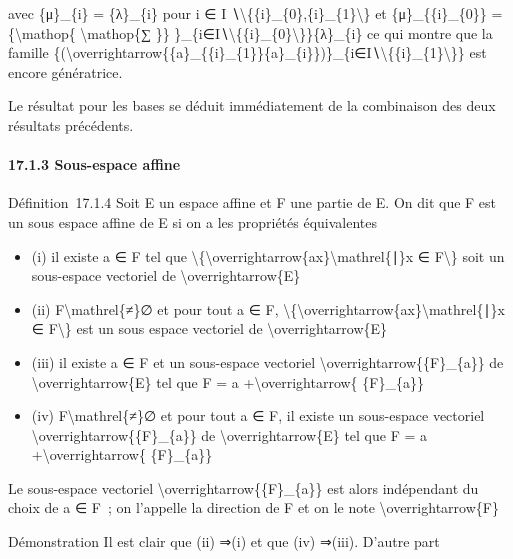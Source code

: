 \documentclass[]{article}
\begin{document}
avec \{μ\}\_\{i\} = \{λ\}\_\{i\} pour i ∈ I
∖\textbackslash{}\{\{i\}\_\{0\},\{i\}\_\{1\}\textbackslash{}\} et
\{μ\}\_\{\{i\}\_\{0\}\} =\{\textbackslash{}mathop\{
\textbackslash{}mathop\{∑ \}\}
\}\_\{i∈I∖\textbackslash{}\{\{i\}\_\{0\}\textbackslash{}\}\}\{λ\}\_\{i\}
ce qui montre que la famille
\{(\textbackslash{}overrightarrow\{\{a\}\_\{\{i\}\_\{1\}\}\{a\}\_\{i\}\})\}\_\{i∈I∖\textbackslash{}\{\{i\}\_\{1\}\textbackslash{}\}\}
est encore génératrice.

Le résultat pour les bases se déduit immédiatement de la combinaison des
deux résultats précédents.

\paragraph{17.1.3 Sous-espace affine}

Définition~17.1.4 Soit E un espace affine et F une partie de E. On dit
que F est un sous espace affine de E si on a les propriétés équivalentes

\begin{itemize}
\itemsep1pt\parskip0pt
\item
  (i) il existe a ∈ F tel que
  \textbackslash{}\{\textbackslash{}overrightarrow\{ax\}\textbackslash{}mathrel\{∣\}x
  ∈ F\textbackslash{}\} soit un sous-espace vectoriel de
  \textbackslash{}overrightarrow\{E\}
\item
  (ii) F\textbackslash{}mathrel\{≠\}∅ et pour tout a ∈ F,
  \textbackslash{}\{\textbackslash{}overrightarrow\{ax\}\textbackslash{}mathrel\{∣\}x
  ∈ F\textbackslash{}\} est un sous espace vectoriel de
  \textbackslash{}overrightarrow\{E\}
\item
  (iii) il existe a ∈ F et un sous-espace vectoriel
  \textbackslash{}overrightarrow\{\{F\}\_\{a\}\} de
  \textbackslash{}overrightarrow\{E\} tel que F = a
  +\textbackslash{}overrightarrow\{ \{F\}\_\{a\}\}
\item
  (iv) F\textbackslash{}mathrel\{≠\}∅ et pour tout a ∈ F, il existe un
  sous-espace vectoriel \textbackslash{}overrightarrow\{\{F\}\_\{a\}\}
  de \textbackslash{}overrightarrow\{E\} tel que F = a
  +\textbackslash{}overrightarrow\{ \{F\}\_\{a\}\}
\end{itemize}

Le sous-espace vectoriel \textbackslash{}overrightarrow\{\{F\}\_\{a\}\}
est alors indépendant du choix de a ∈ F~; on l'appelle la direction de F
et on le note \textbackslash{}overrightarrow\{F\}

Démonstration Il est clair que (ii) ⇒(i) et que (iv) ⇒(iii). D'autre
part
\end{document}
